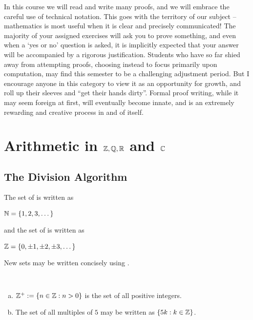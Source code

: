 \documentclass[11pt,fleqn,dvipsnames,usenames]{article}
\newcommand{\p}{\noindent}
\begin{document}
\p In this course we will read and write many proofs, and we will embrace the careful use of technical notation.  This goes with the territory of our subject -- mathematics is most useful when it is clear and precisely communicated!  The majority of your assigned exercises will ask you to prove something, and even when a `yes or no' question is asked, it is implicitly expected that your answer will be accompanied by a rigorous justification.  Students who have so far shied away from attempting proofs, choosing instead to focus primarily upon computation, may find this semester to be a challenging adjustment period.  But I encourage anyone in this category to view it as an opportunity for growth, and roll up their sleeves and ``get their hands dirty''.  Formal proof writing, while it may seem foreign at first, will eventually become innate, and is an extremely rewarding and creative process in and of itself.
\newpage

\tableofcontents
\newpage


\section{Arithmetic in \texorpdfstring{$\mathbb{Z}, \mathbb{Q}, \mathbb{R}$}{Z, Q, R} and \texorpdfstring{$\mathbb{C}$}{C}}
\setcounter{subsection}{0}

\subsection{The Division Algorithm}

The set of  is written as
\begin{center}
$\mathbb{N} = \left\{1,2,3,\dots\right\}$
\end{center}
and the set of  is written as
\begin{center}
\item $\mathbb{Z} = \left\{0, \pm 1, \pm 2,\pm 3,\dots\right\}$
\end{center}
\vsp

\p New sets may be written concisely using .
\vsp

\begin{examples}~
\begin{enumerate}[(a)]
\item $\mathbb{Z}^{+} := \left\{n\in \mathbb{Z}: n > 0\right\}$ is the set of all positive integers.
\item The set of all multiples of $5$ may be written as $\left\{5k:k\in\mathbb{Z}\right\}$.
\end{enumerate}
\end{examples}
\vsp
\end{document}
